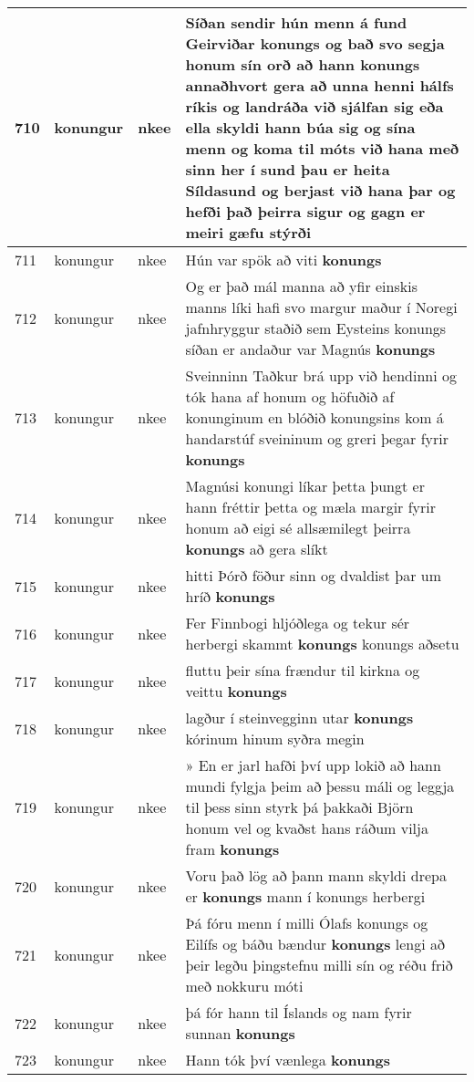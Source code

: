 \documentclass{article}
\begin{document}
\begin{longtable}{p{1cm}|p{1cm}|p{1cm}|p{13cm}}
\hline
710&konungur&nkee&Síðan sendir hún menn á fund Geirviðar konungs og bað svo segja honum sín orð að hann \textbf{konungs} annaðhvort gera að unna henni hálfs ríkis og landráða við sjálfan sig eða ella skyldi hann búa sig og sína menn og koma til móts við hana með sinn her í sund þau er heita Síldasund og berjast við hana þar og hefði það þeirra sigur og gagn er meiri gæfu stýrði\\
\hline
711&konungur&nkee&Hún var spök að viti \textbf{konungs} \\
\hline
712&konungur&nkee&Og er það mál manna að yfir einskis manns líki hafi svo margur maður í Noregi jafnhryggur staðið sem Eysteins konungs síðan er andaður var Magnús \textbf{konungs} \\
\hline
713&konungur&nkee&Sveinninn Taðkur brá upp við hendinni og tók hana af honum og höfuðið af konunginum en blóðið konungsins kom á handarstúf sveininum og greri þegar fyrir \textbf{konungs} \\
\hline
714&konungur&nkee&Magnúsi konungi líkar þetta þungt er hann fréttir þetta og mæla margir fyrir honum að eigi sé allsæmilegt þeirra \textbf{konungs} að gera slíkt\\
\hline
715&konungur&nkee&hitti Þórð föður sinn og dvaldist þar um hríð \textbf{konungs} \\
\hline
716&konungur&nkee&Fer Finnbogi hljóðlega og tekur sér herbergi skammt \textbf{konungs} konungs aðsetu\\
\hline
717&konungur&nkee&fluttu þeir sína frændur til kirkna og veittu \textbf{konungs} \\
\hline
718&konungur&nkee&lagður í steinvegginn utar \textbf{konungs} kórinum hinum syðra megin\\
\hline
719&konungur&nkee&» En er jarl hafði því upp lokið að hann mundi fylgja þeim að þessu máli og leggja til þess sinn styrk þá þakkaði Björn honum vel og kvaðst hans ráðum vilja fram \textbf{konungs} \\
\hline
720&konungur&nkee&Voru það lög að þann mann skyldi drepa er \textbf{konungs} mann í konungs herbergi\\
\hline
721&konungur&nkee&Þá fóru menn í milli Ólafs konungs og Eilífs og báðu bændur \textbf{konungs} lengi að þeir legðu þingstefnu milli sín og réðu frið með nokkuru móti\\
\hline
722&konungur&nkee&þá fór hann til Íslands og nam fyrir sunnan \textbf{konungs} \\
\hline
723&konungur&nkee&Hann tók því vænlega \textbf{konungs} \\

\end{longtable}
\end{document}
